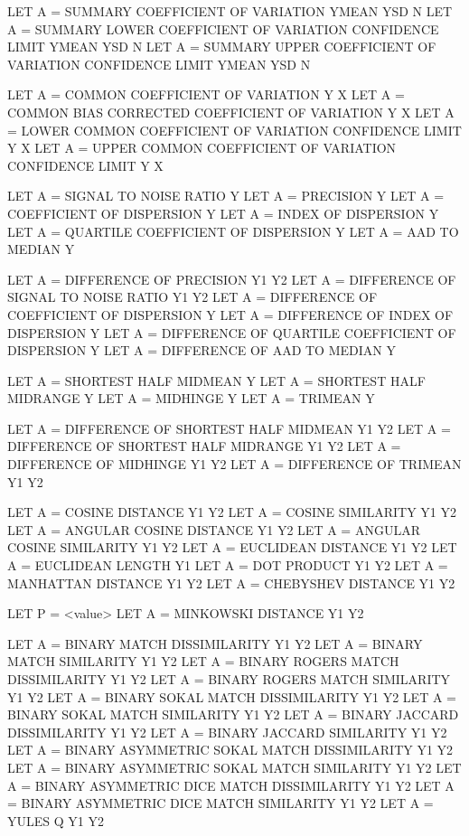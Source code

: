        LET A = SUMMARY COEFFICIENT OF VARIATION YMEAN YSD N
       LET A = SUMMARY LOWER COEFFICIENT OF VARIATION CONFIDENCE LIMIT
               YMEAN YSD N
       LET A = SUMMARY UPPER COEFFICIENT OF VARIATION CONFIDENCE LIMIT
               YMEAN YSD N

       LET A = COMMON COEFFICIENT OF VARIATION Y X
       LET A = COMMON BIAS CORRECTED COEFFICIENT OF VARIATION Y X
       LET A = LOWER COMMON COEFFICIENT OF VARIATION CONFIDENCE LIMIT Y X
       LET A = UPPER COMMON COEFFICIENT OF VARIATION CONFIDENCE LIMIT Y X

       LET A = SIGNAL TO NOISE RATIO Y
       LET A = PRECISION Y
       LET A = COEFFICIENT OF DISPERSION Y
       LET A = INDEX OF DISPERSION Y
       LET A = QUARTILE COEFFICIENT OF DISPERSION Y
       LET A = AAD TO MEDIAN Y

       LET A = DIFFERENCE OF PRECISION Y1 Y2
       LET A = DIFFERENCE OF SIGNAL TO NOISE RATIO Y1 Y2
       LET A = DIFFERENCE OF COEFFICIENT OF DISPERSION Y
       LET A = DIFFERENCE OF INDEX OF DISPERSION Y
       LET A = DIFFERENCE OF QUARTILE COEFFICIENT OF DISPERSION Y
       LET A = DIFFERENCE OF AAD TO MEDIAN Y

       LET A = SHORTEST HALF MIDMEAN Y
       LET A = SHORTEST HALF MIDRANGE Y
       LET A = MIDHINGE Y
       LET A = TRIMEAN Y

       LET A = DIFFERENCE OF SHORTEST HALF MIDMEAN  Y1 Y2
       LET A = DIFFERENCE OF SHORTEST HALF MIDRANGE Y1 Y2
       LET A = DIFFERENCE OF MIDHINGE Y1 Y2
       LET A = DIFFERENCE OF TRIMEAN Y1 Y2

       LET A = COSINE DISTANCE Y1 Y2
       LET A = COSINE SIMILARITY Y1 Y2
       LET A = ANGULAR COSINE DISTANCE Y1 Y2
       LET A = ANGULAR COSINE SIMILARITY Y1 Y2
       LET A = EUCLIDEAN DISTANCE Y1 Y2
       LET A = EUCLIDEAN LENGTH Y1
       LET A = DOT PRODUCT Y1 Y2
       LET A = MANHATTAN DISTANCE Y1 Y2
       LET A = CHEBYSHEV DISTANCE Y1 Y2

       LET P = <value>
       LET A = MINKOWSKI DISTANCE Y1 Y2

       LET A = BINARY MATCH DISSIMILARITY Y1 Y2
       LET A = BINARY MATCH SIMILARITY Y1 Y2
       LET A = BINARY ROGERS MATCH DISSIMILARITY Y1 Y2
       LET A = BINARY ROGERS MATCH SIMILARITY Y1 Y2
       LET A = BINARY SOKAL MATCH DISSIMILARITY Y1 Y2
       LET A = BINARY SOKAL MATCH SIMILARITY Y1 Y2
       LET A = BINARY JACCARD DISSIMILARITY Y1 Y2
       LET A = BINARY JACCARD SIMILARITY Y1 Y2
       LET A = BINARY ASYMMETRIC SOKAL MATCH DISSIMILARITY Y1 Y2
       LET A = BINARY ASYMMETRIC SOKAL MATCH SIMILARITY Y1 Y2
       LET A = BINARY ASYMMETRIC DICE MATCH DISSIMILARITY Y1 Y2
       LET A = BINARY ASYMMETRIC DICE MATCH SIMILARITY Y1 Y2
       LET A = YULES Q Y1 Y2

